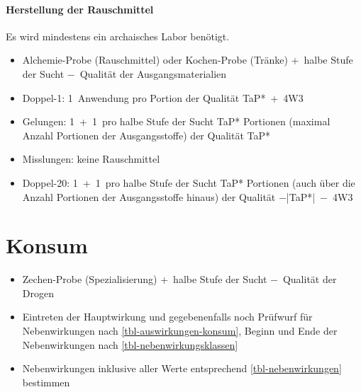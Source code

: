 \begin{multicols}{2}
\paragraph*{Herstellung der Rauschmittel}
Es wird mindestens ein archaisches Labor benötigt.
\begin{itemize}[nosep]
	\item Alchemie-Probe (Rauschmittel) oder Kochen-Probe (Tränke) +~halbe Stufe der Sucht −~Qualität der Ausgangsmaterialien
	\item Doppel-1: 1~Anwendung pro Portion der Qualität TaP*~+~4W3
	\item Gelungen: 1~+~1~pro halbe Stufe der Sucht TaP* Portionen (maximal Anzahl Portionen der Ausgangsstoffe)	der Qualität TaP*
	\item Misslungen: keine Rauschmittel
	\item Doppel-20: 1~+~1~pro halbe Stufe der Sucht TaP* Portionen (auch über die Anzahl Portionen der Ausgangsstoffe hinaus) der Qualität −|TaP*|~−~4W3 
\end{itemize}

\section*{Konsum}
\begin{itemize}[nosep]
	\item Zechen-Probe (Spezialisierung) +~halbe Stufe der Sucht −~Qualität der Drogen
	\item Eintreten der Hauptwirkung und gegebenenfalls noch Prüfwurf für Nebenwirkungen nach \vref{tbl-auswirkungen-konsum}, Beginn und Ende der Nebenwirkungen nach \vref{tbl-nebenwirkungsklassen}
	\item Nebenwirkungen inklusive aller Werte entsprechend \vref{tbl-nebenwirkungen} bestimmen
\end{itemize}
\end{multicols}



